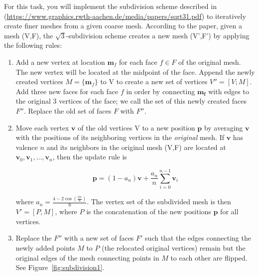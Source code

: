 \documentclass[11pt]{amsart}
\begin{document}
For this task, you will implement the subdivision scheme described in
\cite{Kobbelt00sqrt(3)-subdivision}
(\url{https://www.graphics.rwth-aachen.de/media/papers/sqrt31.pdf}) to
iteratively
create finer meshes from a given coarse mesh. According to the paper, given a
mesh (V,F), the $\sqrt{3}$-subdivision scheme creates a new mesh (V',F')
by applying the following rules:
\begin{enumerate}
\item Add a new vertex at location $\mathbf{m}_f$ for each face $f \in F$ of the
    original mesh. The new vertex will be located at the midpoint of the face.
        Append the newly created vertices $M = \{\mathbf{m}_f\}$ to V to create
        a new set of vertices $V'' = [V;M]$. Add three new faces for each face
        $f$ in order by connecting $\mathbf{m_f}$ with edges to the original 3
        vertices of the face; we call the set of this newly created faces $F''$.
        Replace the old set of faces $F$ with $F''$.
\item Move each vertex $\mathbf v$ of the old vertices V to a new position
    $\mathbf p$ by averaging $\mathbf v$ with the positions of its neighboring
        vertices in the \emph{original} mesh. If $\mathbf v$ has valence $n$ and
        its neighbors in the original mesh (V,F) are located at $\mathbf v_0,
        \mathbf v_1, \ldots, \mathbf v_n$, then the update rule is 


\begin{displaymath}
\mathbf p = (1-a_n)\mathbf v + \frac{a_n}{n}\sum\limits_{i=0}^{n-1}\mathbf v_i
\end{displaymath}

\noindent where $a_n = \frac{4-2\cos\left(\frac{2\pi}{n}\right)}{9}$. The vertex
        set of the subdivided mesh is then $V' = [P,M] $, where $P$ is the
        concatenation of the new positions $\mathbf p$ for all vertices.

\item { Replace the $F''$ with a new set of faces $F'$ such that the edges
    connecting the newly added points $M$ to $P$ (the relocated original
        vertices) remain but the original edges of the mesh connecting points in
        $M$ to each other are flipped. See
        Figure~\ref{fig:subdivision1}. }
\end{enumerate}
\end{document}
